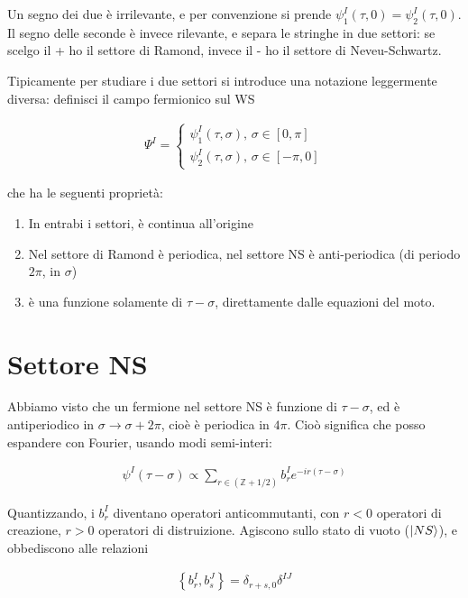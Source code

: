 \documentclass{report}
\begin{document}
Un segno dei due è irrilevante, e per convenzione si prende \(\psi_1^I(\tau, 0) = \psi_2^I (\tau, 0) \). Il segno delle seconde è invece rilevante, e separa le stringhe in due settori: se scelgo il + ho il settore di Ramond, invece il - ho il settore di Neveu-Schwartz. 

Tipicamente per studiare i due settori si introduce una notazione leggermente diversa: definisci il campo fermionico sul WS 

\begin{align}
    \Psi^I = \begin{cases}
        \psi_1^I(\tau, \sigma), \, \sigma \in [0, \pi] \\
        \psi_2^I (\tau, \sigma), \, \sigma \in [-\pi, 0]
    \end{cases}
\end{align}

che ha le seguenti proprietà: 

\begin{enumerate}
    \item In entrabi i settori, è continua all'origine 
    \item Nel settore di Ramond è periodica, nel settore NS è anti-periodica (di periodo \(2\pi\), in \(\sigma\))
    \item è una funzione solamente di \(\tau-\sigma\), direttamente dalle equazioni del moto. 
\end{enumerate}

\section{Settore NS}

Abbiamo visto che un fermione nel settore NS è funzione di \(\tau-\sigma\), ed è antiperiodico in \(\sigma \to \sigma +2\pi\), cioè è periodica in \(4\pi\). Cioò significa che posso espandere con Fourier, usando modi semi-interi: 

\begin{align}
    \psi^I (\tau-\sigma) \propto \sum_{r \in (\mathbb{Z} + 1/2)} b_r^I e^{-ir(\tau-\sigma)}
\end{align}

Quantizzando, i \(b_r^I\) diventano operatori anticommutanti, con \(r<0\) operatori di creazione, \(r>0\) operatori di distruizione. Agiscono sullo stato di vuoto (\(\ket{NS}\)), e obbediscono alle relazioni 

\begin{align}
    \left\{ b_r^I, b_s^J \right\} = \delta_{r+s, 0}\delta^{IJ}
\end{align}
\end{document}
